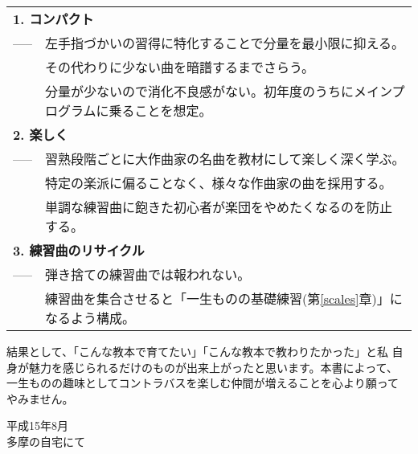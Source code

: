 \begin{center}
\begin{tabular}{ll}
\multicolumn{2}{l}{\bf 1. コンパクト}\\
 ----- & 左手指づかいの習得に特化することで分量を最小限に抑える。\\
       & その代わりに少ない曲を暗譜するまでさらう。\\
       & 分量が少ないので消化不良感がない。初年度のうちにメインプログラムに乗ることを想定。\\
\multicolumn{2}{l}{\bf 2. 楽しく}\\
 ----- & 習熟段階ごとに大作曲家の名曲を教材にして楽しく深く学ぶ。\\
       & 特定の楽派に偏ることなく、様々な作曲家の曲を採用する。\\
       & 単調な練習曲に飽きた初心者が楽団をやめたくなるのを防止する。\\
\multicolumn{2}{l}{\bf 3. 練習曲のリサイクル}\\
 ----- & 弾き捨ての練習曲では報われない。\\
       & 練習曲を集合させると「一生ものの基礎練習(第\ref{scales}章)」になるよう構成。\\
\end{tabular}
\end{center}

結果として、「こんな教本で育てたい」「こんな教本で教わりたかった」と私
自身が魅力を感じられるだけのものが出来上がったと思います。本書によって、
一生ものの趣味としてコントラバスを楽しむ仲間が増えることを心より願って
やみません。\\

\begin{small}
\begin{flushright}
\begin{minipage}{100pt}
\begin{flushleft}
平成15年8月\\
多摩の自宅にて\\
\end{flushleft}
\end{minipage}
\end{flushright}
\end{small}

